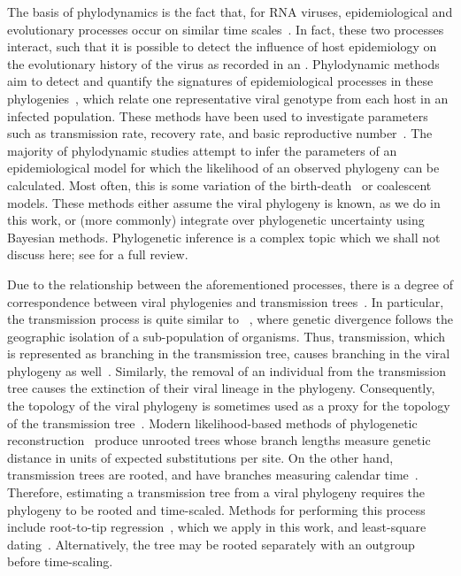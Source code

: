 The basis of phylodynamics is the fact that, for RNA viruses, epidemiological
and evolutionary processes occur on similar time
scales~\autocite{drummond2003measurably}. In fact, these two processes
interact, such that it is possible to detect the influence of host epidemiology
on the evolutionary history of the virus as recorded in an . Phylodynamic methods aim to detect and quantify the
signatures of epidemiological processes in these
phylogenies~\autocite{pybus2009evolutionary, volz2013viral}, which relate one
representative viral genotype from each host in an infected population. These
methods have been used to investigate parameters such as transmission rate,
recovery rate, and basic reproductive number~\autocite{pybus2009evolutionary,
volz2013viral}. The majority of phylodynamic studies attempt to infer the
parameters of an epidemiological model for which the likelihood of an observed
phylogeny can be calculated. Most often, this is some variation of the
birth-death~\autocite{kendall1948generalized, stadler2012estimating} or
coalescent~\autocite{kingman1982coalescent, volz2012complex} models. These
methods either assume the viral phylogeny is known, as we do in this work, or
(more commonly) integrate over phylogenetic uncertainty using Bayesian methods.
Phylogenetic inference is a complex topic which we shall not discuss here; see
\eg \autocite{nei2000molecular} for a full review.

Due to the relationship between the aforementioned processes, there is a degree
of correspondence between viral phylogenies and transmission
trees~\autocite{leitner2002molecular, ypma2013relating, kenah2015algorithms,
kenah2016molecular}. In particular, the transmission process is quite similar
to ~\autocite{coyne2004speciation}, where genetic
divergence follows the geographic isolation of a sub-population of organisms.
Thus, transmission, which is represented as branching in the transmission tree,
causes branching in the viral phylogeny as
well~\autocite{volz2009phylodynamics}. Similarly, the removal of an individual
from the transmission tree causes the extinction of their viral lineage in the
phylogeny. Consequently, the topology of the viral phylogeny is sometimes used
as a proxy for the topology of the transmission
tree~\autocite{hall2015epidemic}. Modern likelihood-based methods of
phylogenetic reconstruction~\autocite[\eg][]{price2010fasttree,
stamatakis2014raxml} produce unrooted trees whose branch lengths measure
genetic distance in units of expected substitutions per site. On the other
hand, transmission trees are rooted, and have branches measuring calendar
time~\autocite{pybus2009evolutionary}. Therefore, estimating a transmission
tree from a viral phylogeny requires the phylogeny to be rooted and
time-scaled. Methods for performing this process include root-to-tip
regression~\autocite{shankarappa1999consistent, korber2000timing,
drummond2003inference}, which we apply in this work, and least-square
dating~\autocite{to2015fast}. Alternatively, the tree may be rooted separately
with an outgroup~\autocite{li1988rates} before time-scaling.

